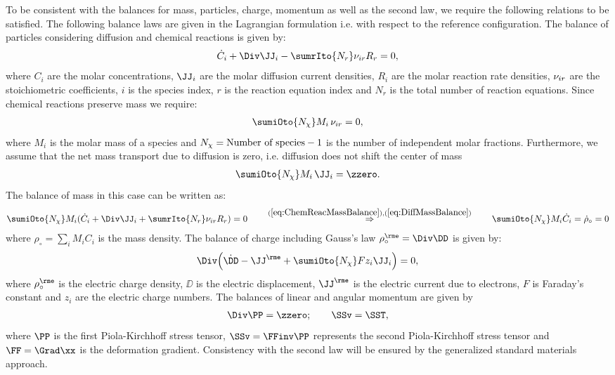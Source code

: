To be consistent with the balances for mass, particles, charge, momentum as well as the second law, we require the following relations to be satisfied. The following balance laws are given in the Lagrangian formulation i.e. with respect to the reference configuration. The balance of particles considering diffusion and chemical reactions is given by: 
\begin{align}
  \dot C_i + \Div\JJ_i - \sumrIto{N_r} \nuir R_r = 0,
\end{align} 
where $C_i$ are the molar concentrations, $\JJ_i$ are the molar diffusion current densities, $R_i$ are the molar reaction rate densities, $\nu_{ir}$ are the stoichiometric coefficients, $i$ is the species index, $r$ is the reaction equation index and $N_r$ is the total number of reaction equations. Since chemical reactions preserve mass we require:
\begin{align}
  \sumiOto{\Nchi} M_i \, \nuir = 0,
  \label{eq:ChemReacMassBalance}
\end{align}
where $M_i$ is the molar mass of a species and $N_{\chi}=\text{Number of species}-1$ is the number of independent molar fractions. Furthermore, we assume that the net mass transport due to diffusion is zero, i.e. diffusion does not shift the center of mass 
\begin{align}
  \sumiOto{\Nchi} M_i \, \JJ_i = \zzero.
  \label{eq:DiffMassBalance}
\end{align}
The balance of mass in this case can be written as:
\begin{align}
  \sumiOto{\Nchi}  M_i (\dot C_i + \Div\JJ_i + \sumrIto{N_r} \nuir R_r) = 0 \qquad \stackrel{(\ref{eq:ChemReacMassBalance}),(\ref{eq:DiffMassBalance})}{\Rightarrow} \qquad \sumiOto{\Nchi} M_i \dot C_i = \dot\rho_\circ = 0
\end{align}
where $\rho_\circ=\sum_i M_i C_i$ is the mass density. The balance of charge including Gauss's law $\rhoe_\circ = \Div\DD$ is given by:
\begin{align}
  \Div\Big( \dot\DD - \JJe  + \sumiOto{\Nchi} Fz_i\JJ_i \Big) = 0,
\end{align}
where $\rhoe_\circ$ is the electric charge density, $\DD$ is the electric displacement, $\JJe$ is the electric current due to electrons, $F$ is Faraday's constant and $z_i$ are the electric charge  numbers. The balances of linear and angular momentum are given by
\begin{align}
  \Div \PP = \zzero; \qquad \SSv = \SST,
\end{align}
where $\PP$ is the first Piola-Kirchhoff stress tensor, $\SSv=\FFinv\PP$ represents the second Piola-Kirchhoff stress tensor and $\FF=\Grad\xx$ is the deformation gradient. Consistency with the second law will be ensured by the generalized standard materials approach. 

